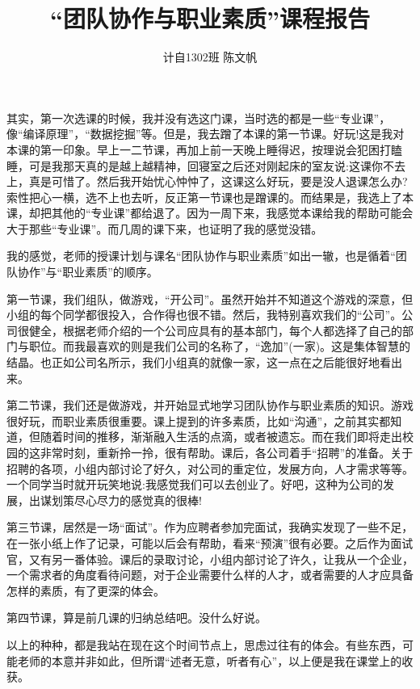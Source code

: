 \documentclass[	10pt，a4paper， UTF8]{ctexart}
\begin{document}
\title{\textbf{“团队协作与职业素质”课程报告}}
\author{计自1302班 \space \space 陈文帆 \space {}}
\maketitle

其实，第一次选课的时候，我并没有选这门课，当时选的都是一些“专业课”，像“编译原理”，“数据挖掘”等。但是，我去蹭了本课的第一节课。好玩!这是我对本课的第一印象。早上一二节课，再加上前一天晚上睡得迟，按理说会犯困打瞌睡，可是我那天真的是越上越精神，回寝室之后还对刚起床的室友说:这课你不去上，真是可惜了。然后我开始忧心忡忡了，这课这么好玩，要是没人退课怎么办?索性把心一横，选不上也去听，反正第一节课也是蹭课的。而结果是，我选上了本课，却把其他的“专业课”都给退了。因为一周下来，我感觉本课给我的帮助可能会大于那些“专业课”。而几周的课下来，也证明了我的感觉没错。

我的感觉，老师的授课计划与课名“团队协作与职业素质”如出一辙，也是循着“团队协作”与“职业素质”的顺序。

第一节课，我们组队，做游戏，“开公司”。虽然开始并不知道这个游戏的深意，但小组的每个同学都很投入，合作得也很不错。然后，我特别喜欢我们的“公司”。公司很健全，根据老师介绍的一个公司应具有的基本部门，每个人都选择了自己的部门与职位。而我最喜欢的则是我们公司的名称了，“逸加”(一家)。这是集体智慧的结晶。也正如公司名所示，我们小组真的就像一家，这一点在之后能很好地看出来。

第二节课，我们还是做游戏，并开始显式地学习团队协作与职业素质的知识。游戏很好玩，而职业素质很重要。课上提到的许多素质，比如“沟通”，之前其实都知道，但随着时间的推移，渐渐融入生活的点滴，或者被遗忘。而在我们即将走出校园的这非常时刻，重新拎一拎，很有帮助。课后，各公司着手“招聘”的准备。关于招聘的各项，小组内部讨论了好久，对公司的重定位，发展方向，人才需求等等。一个同学当时就开玩笑地说:我感觉我们可以去创业了。好吧，这种为公司的发展，出谋划策尽心尽力的感觉真的很棒!

第三节课，居然是一场“面试”。作为应聘者参加完面试，我确实发现了一些不足，在一张小纸上作了记录，可能以后会有帮助，看来“预演”很有必要。之后作为面试官，又有另一番体验。课后的录取讨论，小组内部讨论了许久，让我从一个企业，一个需求者的角度看待问题，对于企业需要什么样的人才，或者需要的人才应具备怎样的素质，有了更深的体会。

第四节课，算是前几课的归纳总结吧。没什么好说。

以上的种种，都是我站在现在这个时间节点上，思虑过往有的体会。有些东西，可能老师的本意并非如此，但所谓“述者无意，听者有心”，以上便是我在课堂上的收获。
\end{document}
